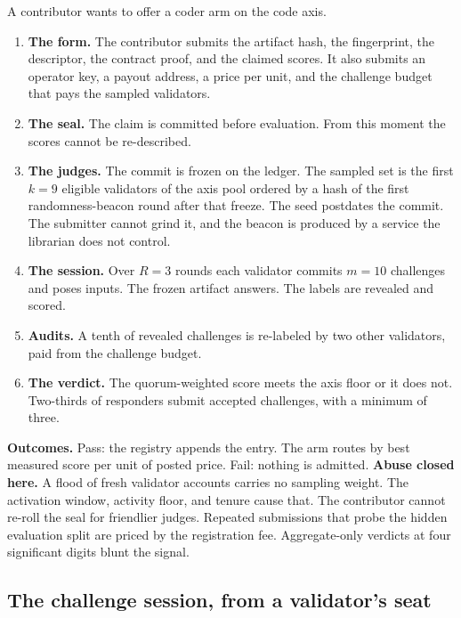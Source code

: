 \documentclass[11pt]{article}
\begin{document}
A contributor wants to offer a coder arm on the code axis.
\begin{enumerate}
\item \textbf{The form.} The contributor submits the artifact
hash, the fingerprint, the descriptor, the contract proof, and
the claimed scores. It also submits an operator key, a payout
address, a price per unit, and the challenge budget that pays the
sampled validators.
\item \textbf{The seal.} The claim is committed before
evaluation. From this moment the scores cannot be re-described.
\item \textbf{The judges.} The commit is frozen on the ledger.
The sampled set is the first $k=9$ eligible validators of the
axis pool ordered by a hash of the first randomness-beacon round
after that
freeze. The seed postdates the commit. The submitter cannot grind
it, and the beacon is produced by a service the librarian does
not control.
\item \textbf{The session.} Over $R=3$ rounds each validator
commits $m=10$ challenges and poses inputs. The frozen artifact
answers. The labels are revealed and scored.
\item \textbf{Audits.} A tenth of revealed challenges is
re-labeled by two other validators, paid from the challenge
budget.
\item \textbf{The verdict.} The quorum-weighted score meets the
axis floor or it does not. Two-thirds of responders submit
accepted challenges, with a minimum of three.
\end{enumerate}
\textbf{Outcomes.} Pass: the registry appends the entry. The arm
routes by best measured score per unit of posted price. Fail:
nothing is admitted. \textbf{Abuse closed here.} A flood of fresh
validator accounts carries no sampling weight. The activation
window, activity floor, and tenure cause that. The contributor
cannot re-roll the seal for friendlier judges. Repeated
submissions that probe the hidden evaluation split are priced by
the registration fee. Aggregate-only verdicts at four significant
digits blunt the signal.

\subsection{The challenge session, from a validator's seat}
\end{document}
